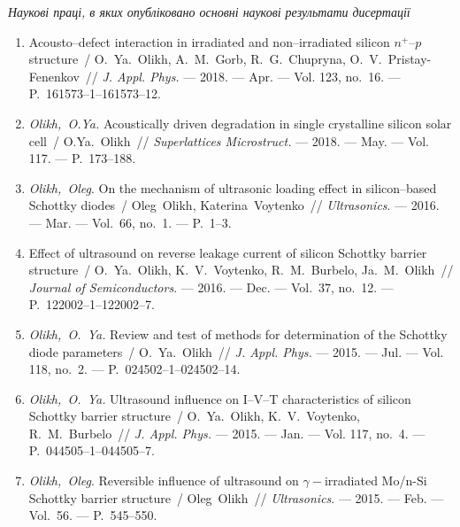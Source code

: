\begin{center}%
{\textbf{\MakeUppercase{\authorbibtitle}} }
\end{center}%

\begin{center}%
\emph{Наукові праці, в яких опубліковано основні наукові результати дисертації}
\end{center}%
\begin{enumerate}[label=\arabic*.,leftmargin=1cm,itemindent=0cm]
\item
Acousto--defect interaction in irradiated and non--irradiated silicon
  $n^+$--$p$ structure~/ O.~Ya.~Olikh, A.~M.~Gorb, R.~G.~Chupryna,
  O.~V.~Pristay-Fenenkov~// \emph{J. Appl. Phys.} --- 2018. --- Apr. ---
 Vol. 123, no.~16. --- P.~161573--1--161573--12.

\item
\emph{Olikh,~O.Ya.} Acoustically driven degradation in single crystalline
  silicon solar cell~/ O.Ya.~Olikh~// \emph{Superlattices Microstruct.} ---
  2018. --- May. ---
  Vol. 117. ---
  P.~173--188.

\item
\emph{Olikh,~Oleg}. On the mechanism of ultrasonic loading effect in
  silicon--based {S}chottky diodes~/ Oleg~Olikh, Katerina~Voytenko~//
  \emph{Ultrasonics}. ---
  2016. --- Mar. ---
  Vol.~66, no.~1. ---
  P.~1--3.

\item
Effect of ultrasound on reverse leakage current of silicon {S}chottky barrier
  structure~/ O.~Ya.~Olikh, K.~V.~Voytenko, R.~M.~Burbelo, Ja.~M.~Olikh~//
  \emph{Journal of Semiconductors}. ---
  2016. --- Dec. ---
  Vol.~37, no.~12. ---
  P.~122002--1--122002--7.

\item
\emph{Olikh,~O.~Ya.} Review and test of methods for determination of the
  {S}chottky diode parameters~/ O.~Ya.~Olikh~// \emph{J. Appl. Phys.} ---
  2015. --- Jul. ---
  Vol. 118, no.~2. ---
  P.~024502--1--024502--14.

\item
\emph{Olikh,~O.~Ya.} Ultrasound influence on {I}--{V}--{T} characteristics
  of silicon {S}chottky barrier structure~/ O.~Ya.~Olikh, K.~V.~Voytenko,
  R.~M.~Burbelo~// \emph{J. Appl. Phys.} ---
  2015. --- Jan. ---
  Vol. 117, no.~4. ---
  P.~044505--1--044505--7.

\item
\emph{Olikh,~Oleg}. Reversible influence of ultrasound on
  $\gamma-$irradiated {M}o/n-{S}i {S}chottky barrier structure~/ Oleg~Olikh~//
  \emph{Ultrasonics}. ---
  2015. --- Feb. ---
  Vol.~56. ---
  P.~545--550.


\end{enumerate}
